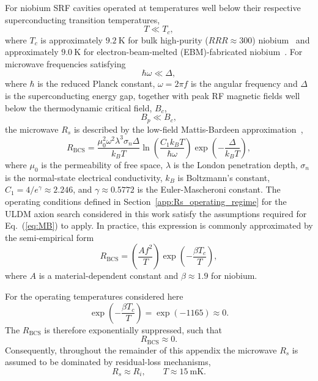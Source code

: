 \documentclass[
  aps,
  physrev,
  reprint,
  superscriptaddress,
  nofootinbib,
  amsmath,
  amssymb
]{revtex4-2}
\begin{document}
For niobium SRF cavities operated at temperatures well below their respective superconducting transition temperatures,
\begin{equation}
    T\ll T_c,
\end{equation}
where $T_c$ is approximately $9.2~\mathrm{K}$ for bulk high-purity ($RRR\approx 300$) niobium~\cite{Gurevich2012} and approximately $9.0~\mathrm{K}$ for electron-beam-melted (EBM)-fabricated niobium~\cite{Frigola2015}. For microwave frequencies satisfying
\begin{equation}
    \hbar\omega\ll\Delta,
\end{equation}
where $\hbar$ is the reduced Planck constant, $\omega=2\pi f$ is the angular frequency and $\Delta$ is the superconducting energy gap, together with peak RF magnetic fields well below the thermodynamic critical field, $B_c$,
\begin{equation}
    B_p\ll B_c,
\end{equation}
the microwave $R_s$ is described by the low-field Mattis-Bardeen approximation~\cite{Gurevich2012},
\begin{equation}
    R_{\mathrm{BCS}}
    =
    \frac{\mu_0^2\omega^2\lambda^3\sigma_n\Delta}
         {k_BT}
    \ln\!\left(
        \frac{C_1k_BT}
             {\hbar\omega}
    \right)
    \exp\!\left(
        -\frac{\Delta}{k_BT}
    \right),
    \label{eq:MB}
\end{equation}
where $\mu_0$ is the permeability of free space, $\lambda$ is the London penetration depth, $\sigma_n$ is the normal-state electrical conductivity, $k_B$ is Boltzmann's constant, $C_1=4/e^\gamma\approx2.246$, and $\gamma\approx0.5772$ is the Euler-Mascheroni constant. The operating conditions defined in Section~\ref{app:Rs_operating_regime} for the ULDM axion search considered in this work satisfy the assumptions required for Eq.~(\ref{eq:MB}) to apply. In practice, this expression is commonly approximated by the semi-empirical form~\cite{Gurevich2012}
\begin{equation}
    R_{\mathrm{BCS}}
    =
    \left(
        \frac{Af^2}{T}
    \right)
    \exp\!\left(
        -\frac{\beta T_c}{T}
    \right),
\end{equation}
where $A$ is a material-dependent constant and $\beta\approx1.9$ for niobium.

For the operating temperatures considered here
\begin{equation}
    \exp\!\left(
        -\frac{\beta T_c}{T}
    \right)
    =
    \exp(-1165)
    \approx0.
\end{equation}
The $R_{\mathrm{BCS}}$ is therefore exponentially suppressed, such that
\begin{equation}
    \boxed{R_{\mathrm{BCS}}\approx0.}
\end{equation}
Consequently, throughout the remainder of this appendix the microwave $R_s$ is assumed to be dominated by residual-loss mechanisms,
\begin{equation}
    \boxed{R_s \approx R_i, \qquad T \approx 15~\mathrm{mK}.}
\end{equation}
\end{document}
